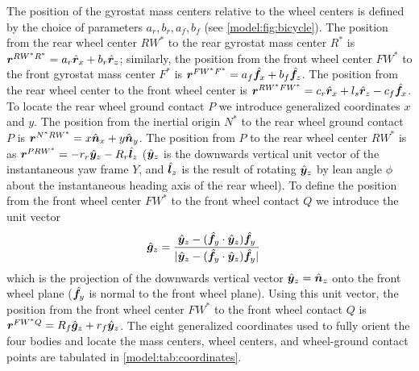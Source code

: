 The position of the gyrostat mass centers relative to the wheel centers is
defined by the choice of parameters $a_r, b_r, a_f, b_f$ (see
\autoref{model:fig:bicycle}). The position from the rear wheel center $RW^*$ to
the rear gyrostat mass center $R^*$ is $\boldsymbol{r}^{RW^*R^*} = a_r \hat{\boldsymbol{r}}_{x} + b_r
\hat{\boldsymbol{r}}_{z}$; similarly, the position from the front wheel center $FW^*$ to the
front gyrostat mass center $F^*$ is $\boldsymbol{r}^{FW^*F^*} = a_f \hat{\boldsymbol{f}}_{x} + b_f
\hat{\boldsymbol{f}}_{z}$. The position from the rear wheel center to the front wheel center
is $\boldsymbol{r}^{RW^*FW^*} = c_r \hat{\boldsymbol{r}}_{x} + l_s \hat{\boldsymbol{r}}_{z} - c_f \hat{\boldsymbol{f}}_{x}$. To
locate the rear wheel ground contact $P$ we introduce generalized coordinates
$x$ and $y$. The position from the inertial origin $N^*$ to the rear wheel
ground contact $P$ is $\boldsymbol{r}^{N^*RW^*} = x \hat{\boldsymbol{n}}_{x} + y \hat{\boldsymbol{n}}_{y}$. The
position from $P$ to the rear wheel center $RW^*$ is as $\boldsymbol{r}^{PRW^*} = - r_r
\hat{\boldsymbol{y}}_{z} - R_r \hat{\boldsymbol{l}}_{z}$ ($\hat{\boldsymbol{y}}_{z}$ is the downwards vertical unit vector
of the instantaneous yaw frame $Y$, and $\hat{\boldsymbol{l}}_{z}$ is the result of rotating
$\hat{\boldsymbol{y}}_{z}$ by lean angle $\phi$ about the instantaneous heading axis of the
rear wheel).  To define the position from the front wheel center $FW^*$ to the
front wheel contact $Q$ we introduce the unit vector
\begin{align}
  \hat{\boldsymbol{g}}_{z} &= \frac{\hat{\boldsymbol{y}}_{z} - (\hat{\boldsymbol{f}}_{y} \cdot \hat{\boldsymbol{y}}_{z})
  \hat{\boldsymbol{f}}_{y}}{|\hat{\boldsymbol{y}}_{z} - (\hat{\boldsymbol{f}}_{y} \cdot \hat{\boldsymbol{y}}_{z})
  \hat{\boldsymbol{f}}_{y}|}
\end{align}
which is the projection of the downwards vertical vector $\hat{\boldsymbol{y}}_{z}=\hat{\boldsymbol{n}}_{z}$
onto the front wheel plane ($\hat{\boldsymbol{f}}_{y}$ is normal to the front wheel plane).
Using this unit vector, the position from the front wheel center $FW^*$ to the
front wheel contact $Q$ is $\boldsymbol{r}^{FW^*Q} = R_f \hat{\boldsymbol{g}}_{z} + r_f \hat{\boldsymbol{y}}_{z}$.
The eight generalized coordinates used to fully orient the four bodies and
locate the mass centers, wheel centers, and wheel-ground contact points are
tabulated in \autoref{model:tab:coordinates}.
